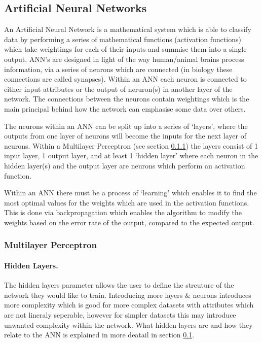 \documentclass[12pt]{article}
\begin{document}
  \subsection{Artificial Neural Networks} \label{ann}
    An Artificial Neural Network is a mathematical system which is able to classify data by performing a series of mathematical functions (activation functions) which take weightings for each of their inputs and summise them into a single output. ANN's are designed in light of the way human/animal brains process information, via a series of neurons which are connected (in biology these connections are called synapses). Within an ANN each neuron is connected to either input attributes or the output of neruron(s) in another layer of the network. The connections between the neurons contain weightings which is the main principal behind how the network can emphasise some data over others.

    The neurons within an ANN can be split up into a series of ‘layers’, where the outputs from one layer of neurons will become the inputs for the next layer of neurons. Within a Multilayer Perceptron (see section \ref{mlp}) the layers consist of 1 input layer, 1 output layer, and at least 1 ‘hidden layer’ where each neuron in the hidden layer(s) and the output layer are neurons which perform an activation function.

    Within an ANN there must be a process of ‘learning’ which enables it to find the most optimal values for the weights which are used in the activation functions. This is done via backpropagation which enables the algorithm to modify the weights based on the error rate of the output, compared to the expected output.


      \subsubsection{Multilayer Perceptron} \label{mlp}
        \citep{minsky2017perceptrons}
        \paragraph{Hidden Layers.}
          The hidden layers parameter allows the user to define the strcuture of the network they would like to train. Introducing more layers \& neurons introduces more complexity which is good for more complex datasets with attributes which are not lineraly seperable, however for simpler datasets this may introduce unwanted complexity within the network. What hidden layers are and how they relate to the ANN is explained in more deatail in section \ref{ann}.
\end{document}
